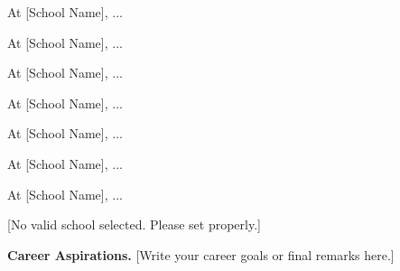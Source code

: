 \documentclass[11pt]{article}
\newcounter{schoolID}
\newcommand{\schoolname}{[School Name]}
\newcommand{\schoolname}{University of California, Berkeley}
\newcommand{\schoolname}{Stanford University}
\newcommand{\schoolname}{Massachusetts Institute of Technology}
\newcommand{\schoolname}{Carnegie Mellon University}
\newcommand{\schoolname}{Georgia Institute of Technology}
\newcommand{\schoolname}{New York University}
\newcommand{\schoolname}{Columbia University}
\newcommand{\schoolname}{Cornell University}
\newcommand{\schoolname}{University of Washington}
\newcommand{\schoolname}{University of Illinois at Urbana-Champaign}
\newcommand{\schoolname}{University of California, San Diego}
\newcommand{\schoolname}{Rice University}
\newcommand{\schoolname}{[School Name]}
\begin{document}
\or
  At {\schoolname}, ...

\or
  At {\schoolname}, ...

\or
  At {\schoolname}, ...

\or
  At {\schoolname}, ...

\or
  At {\schoolname}, ...

\or
  At {\schoolname}, ...

\or
  At {\schoolname}, ...

\else
  [No valid school selected. Please set \setcounter{schoolID}{X} properly.]
\fi


\textbf{Career Aspirations.} [Write your career goals or final remarks here.]

\clearpage
\printbibliography
\end{document}
